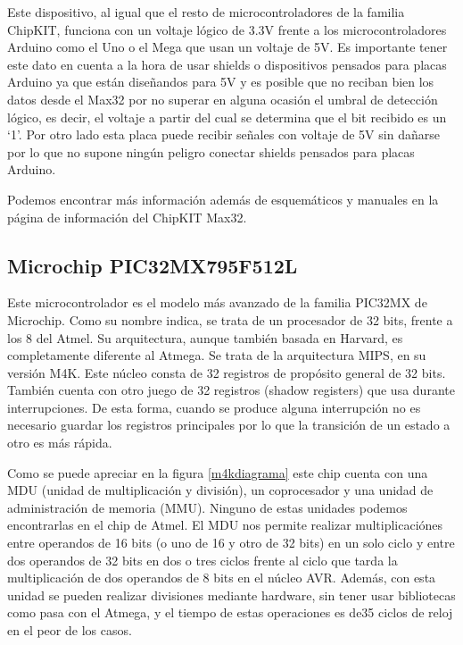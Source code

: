 Este dispositivo, al igual que el resto de microcontroladores de la familia ChipKIT, funciona con un voltaje lógico de 3.3V frente a los microcontroladores Arduino como el Uno o el Mega que usan un voltaje de 5V. Es importante tener este dato en cuenta a la hora de usar shields o dispositivos pensados para placas Arduino ya que están diseñandos para 5V y es posible que no reciban bien los datos desde el Max32 por no superar en alguna ocasión el umbral de detección lógico, es decir, el voltaje a partir del cual se determina que el bit recibido es un `1'. Por otro lado esta placa puede recibir señales con voltaje de 5V sin dañarse por lo que no supone ningún peligro conectar shields pensados para placas Arduino.

Podemos encontrar más información además de esquemáticos y manuales en la página de información del ChipKIT Max32.\cite{website:max32}

\subsection*{Microchip PIC32MX795F512L}
Este microcontrolador es el modelo más avanzado de la familia PIC32MX de Microchip. Como su nombre indica, se trata de un procesador de 32 bits, frente a los 8 del Atmel. Su arquitectura, aunque también basada en Harvard, es completamente diferente al Atmega. Se trata de la arquitectura MIPS, en su versión M4K. Este núcleo consta de 32 registros de propósito general de 32 bits. También cuenta con otro juego de 32 registros (shadow registers) que usa durante interrupciones. De esta forma, cuando se produce alguna interrupción no es necesario guardar los registros principales por lo que la transición de un estado a otro es más rápida.


Como se puede apreciar en la figura \ref{m4kdiagrama} este chip cuenta con una MDU (unidad de multiplicación y división), un coprocesador y una unidad de administración de memoria (MMU). Ninguno de estas unidades podemos encontrarlas en el chip de Atmel. El MDU nos permite realizar multiplicaciónes entre operandos de 16 bits (o uno de 16 y otro de 32 bits) en un solo ciclo y entre dos operandos de 32 bits en dos o tres ciclos frente al ciclo que tarda la multiplicación de dos operandos de 8 bits en el núcleo AVR. Además, con esta unidad se pueden realizar divisiones mediante hardware, sin tener usar bibliotecas como pasa con el Atmega, y el tiempo de estas operaciones es de35 ciclos de reloj en el peor de los casos.

